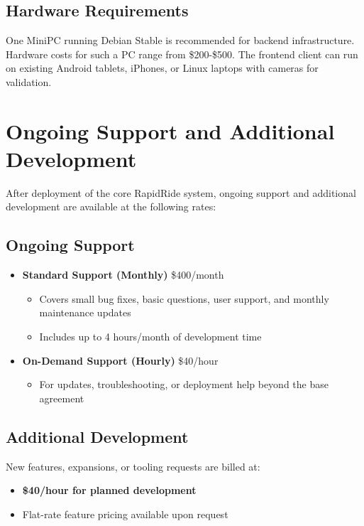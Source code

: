 \documentclass[12pt]{article}
\begin{document}
\subsection*{Hardware Requirements}
One MiniPC running Debian Stable is recommended for backend infrastructure. Hardware costs for such a PC range from
\$200-\$500.
The frontend client can run on existing Android tablets, iPhones, or Linux laptops with cameras for validation.


\section{Ongoing Support and Additional Development}

After deployment of the core RapidRide system, ongoing support and additional development are available at the following rates:

\subsection*{Ongoing Support}
\begin{itemize}
    \item \textbf{Standard Support (Monthly)} \hfill \$400/month
    \begin{itemize}
        \item Covers small bug fixes, basic questions, user support, and monthly maintenance updates
        \item Includes up to 4 hours/month of development time
    \end{itemize}
    \item \textbf{On-Demand Support (Hourly)} \hfill \$40/hour
    \begin{itemize}
        \item For updates, troubleshooting, or deployment help beyond the base agreement
    \end{itemize}
\end{itemize}

\subsection*{Additional Development}
New features, expansions, or tooling requests are billed at:

\begin{itemize}
    \item \textbf{\$40/hour for planned development}
    \item Flat-rate feature pricing available upon request
\end{itemize}
\end{document}

